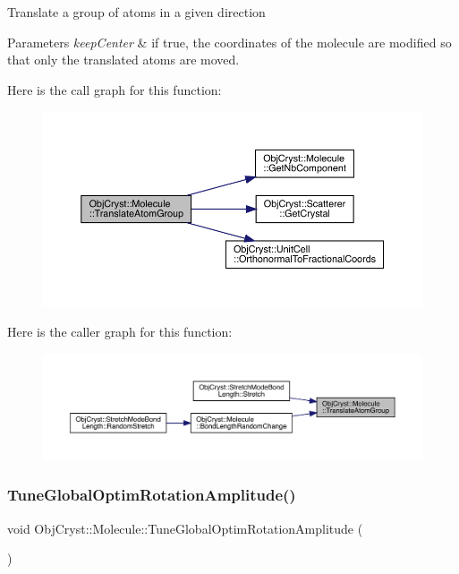 Translate a group of atoms in a given direction


\begin{DoxyParams}{Parameters}
{\em keep\+Center} & if true, the coordinates of the molecule are modified so that only the translated atoms are moved. \\
\hline
\end{DoxyParams}
Here is the call graph for this function\+:
\nopagebreak
\begin{figure}[H]
\begin{center}
\leavevmode
\includegraphics[width=350pt]{class_obj_cryst_1_1_molecule_a0d3122b53dd81aa23d2aaa2427e6291e_cgraph}
\end{center}
\end{figure}
Here is the caller graph for this function\+:
\nopagebreak
\begin{figure}[H]
\begin{center}
\leavevmode
\includegraphics[width=350pt]{class_obj_cryst_1_1_molecule_a0d3122b53dd81aa23d2aaa2427e6291e_icgraph}
\end{center}
\end{figure}
\mbox{\label{class_obj_cryst_1_1_molecule_a9cc198b9cb896d28c7bd90a775db4ec2}} 
\subsubsection{\texorpdfstring{TuneGlobalOptimRotationAmplitude()}{TuneGlobalOptimRotationAmplitude()}}
{\footnotesize\ttfamily void Obj\+Cryst\+::\+Molecule\+::\+Tune\+Global\+Optim\+Rotation\+Amplitude (\begin{DoxyParamCaption}{ }\end{DoxyParamCaption})}

